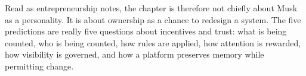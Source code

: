 Read as entrepreneurship notes, the chapter is therefore not chiefly about Musk as a personality. It is about ownership as a chance to redesign a system. The five predictions are really five questions about incentives and trust: what is being counted, who is being counted, how rules are applied, how attention is rewarded, how visibility is governed, and how a platform preserves memory while permitting change.
